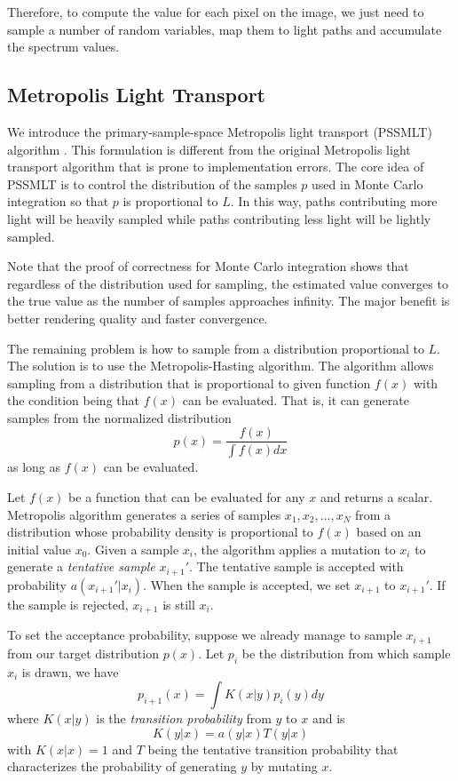 \documentclass{article}
\begin{document}
Therefore, to compute the value for each pixel on the image, we just need to sample a number of random variables, map them to light paths and accumulate the spectrum values.

\subsection{Metropolis Light Transport}

We introduce the primary-sample-space Metropolis light transport (PSSMLT) algorithm \cite{pbrt}. This formulation is different from the original Metropolis light transport algorithm that is prone to implementation errors. The core idea of PSSMLT is to control the distribution of the samples $p$ used in Monte Carlo integration so that $p$ is proportional to $L$. In this way, paths contributing more light will be heavily sampled while paths contributing less light will be lightly sampled.

Note that the proof of correctness for Monte Carlo integration shows that regardless of the distribution used for sampling, the estimated value converges to the true value as the number of samples approaches infinity. The major benefit is better rendering quality and faster convergence.

The remaining problem is how to sample from a distribution proportional to $L$. The solution is to use the Metropolis-Hasting algorithm. The algorithm allows sampling from a distribution that is proportional to given function $f(x)$ with the condition being that $f(x)$ can be evaluated. That is, it can generate samples from the normalized distribution
\[
    p(x) = \frac{f(x)}{\int f(x)dx}
\]
as long as $f(x)$ can be evaluated.

Let $f(x)$ be a function that can be evaluated for any $x$ and returns a scalar. Metropolis algorithm generates a series of samples $x_1, x_2, \dots, x_N$ from a distribution whose probability density is proportional to $f(x)$ based on an initial value $x_0$. Given a sample $x_i$, the algorithm applies a mutation to $x_i$ to generate a \emph{tentative sample} $x_{i + 1}'$. The tentative sample is accepted with probability $a(x_{i + 1}'|x_i)$. When the sample is accepted, we set $x_{i + 1}$ to $x_{i + 1}'$. If the sample is rejected, $x_{i + 1}$ is still $x_i$.

To set the acceptance probability, suppose we already manage to sample $x_{i + 1}$ from our target distribution $p(x)$. Let $p_i$ be the distribution from which sample $x_i$ is drawn, we have
\begin{equation}
    \label{eq:sample-cdf}
    p_{i + 1}(x) = \int K(x|y)p_i(y)dy
\end{equation}
where $K(x|y)$ is the \emph{transition probability} from $y$ to $x$ and is
\[
    K(y|x) = a(y|x)T(y|x)
\]
with $K(x|x) = 1$ and $T$ being the tentative transition probability that characterizes the probability of generating $y$ by mutating $x$.
\end{document}
